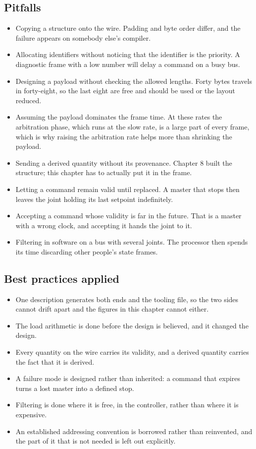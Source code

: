 \subsection*{Pitfalls}

\begin{itemize}
\item Copying a structure onto the wire. Padding and byte order differ, and the
failure appears on somebody else's compiler.
\item Allocating identifiers without noticing that the identifier is the
priority. A diagnostic frame with a low number will delay a command on a busy
bus.
\item Designing a payload without checking the allowed lengths. Forty bytes
travels in forty-eight, so the last eight are free and should be used or the
layout reduced.
\item Assuming the payload dominates the frame time. At these rates the
arbitration phase, which runs at the slow rate, is a large part of every frame,
which is why raising the arbitration rate helps more than shrinking the payload.
\item Sending a derived quantity without its provenance. Chapter 8 built the
structure; this chapter has to actually put it in the frame.
\item Letting a command remain valid until replaced. A master that stops then
leaves the joint holding its last setpoint indefinitely.
\item Accepting a command whose validity is far in the future. That is a master
with a wrong clock, and accepting it hands the joint to it.
\item Filtering in software on a bus with several joints. The processor then
spends its time discarding other people's state frames.
\end{itemize}

\subsection*{Best practices applied}

\begin{itemize}
\item One description generates both ends and the tooling file, so the two sides
cannot drift apart and the figures in this chapter cannot either.
\item The load arithmetic is done before the design is believed, and it changed
the design.
\item Every quantity on the wire carries its validity, and a derived quantity
carries the fact that it is derived.
\item A failure mode is designed rather than inherited: a command that expires
turns a lost master into a defined stop.
\item Filtering is done where it is free, in the controller, rather than where
it is expensive.
\item An established addressing convention is borrowed rather than reinvented,
and the part of it that is not needed is left out explicitly.
\end{itemize}

